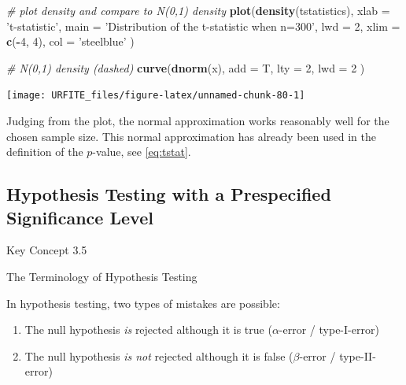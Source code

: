 \documentclass[]{book}
\newenvironment{Shaded}{\begin{snugshade}}{\end{snugshade}}
\newcommand{\KeywordTok}[1]{\textcolor[rgb]{0.13,0.29,0.53}{\textbf{#1}}}
\newcommand{\DataTypeTok}[1]{\textcolor[rgb]{0.13,0.29,0.53}{#1}}
\newcommand{\DecValTok}[1]{\textcolor[rgb]{0.00,0.00,0.81}{#1}}
\newcommand{\StringTok}[1]{\textcolor[rgb]{0.31,0.60,0.02}{#1}}
\newcommand{\CommentTok}[1]{\textcolor[rgb]{0.56,0.35,0.01}{\textit{#1}}}
\newcommand{\OperatorTok}[1]{\textcolor[rgb]{0.81,0.36,0.00}{\textbf{#1}}}
\newcommand{\NormalTok}[1]{#1}
\theoremstyle{definition}
\theoremstyle{definition}
\theoremstyle{definition}
\theoremstyle{remark}
\begin{document}
\begin{Shaded}
\begin{Highlighting}[]
\CommentTok{# plot density and compare to N(0,1) density}
\KeywordTok{plot}\NormalTok{(}\KeywordTok{density}\NormalTok{(tstatistics),}
     \DataTypeTok{xlab =} \StringTok{'t-statistic'}\NormalTok{,}
     \DataTypeTok{main =} \StringTok{'Distribution of the t-statistic when n=300'}\NormalTok{,}
     \DataTypeTok{lwd =} \DecValTok{2}\NormalTok{,}
     \DataTypeTok{xlim =} \KeywordTok{c}\NormalTok{(}\OperatorTok{-}\DecValTok{4}\NormalTok{, }\DecValTok{4}\NormalTok{),}
     \DataTypeTok{col =} \StringTok{'steelblue'}
\NormalTok{     )}

\CommentTok{# N(0,1) density (dashed)}
\KeywordTok{curve}\NormalTok{(}\KeywordTok{dnorm}\NormalTok{(x), }
      \DataTypeTok{add =}\NormalTok{ T, }
      \DataTypeTok{lty =} \DecValTok{2}\NormalTok{, }
      \DataTypeTok{lwd =} \DecValTok{2}
\NormalTok{      )}
\end{Highlighting}
\end{Shaded}

\begin{center}\texttt{[image: URFITE\_files/figure-latex/unnamed-chunk-80-1]} \end{center}

Judging from the plot, the normal approximation works reasonably well
for the chosen sample size. This normal approximation has already been
used in the definition of the \(p\)-value, see \eqref{eq:tstat}.

\subsection*{Hypothesis Testing with a Prespecified Significance
Level}\label{hypothesis-testing-with-a-prespecified-significance-level}

Key Concept 3.5

The Terminology of Hypothesis Testing

In hypothesis testing, two types of mistakes are possible:

\begin{enumerate}
\def\labelenumi{\arabic{enumi}.}
\item
  The null hypothesis \emph{is} rejected although it is true
  (\(\alpha\)-error / type-I-error)
\item
  The null hypothesis \emph{is not} rejected although it is false
  (\(\beta\)-error / type-II-error)
\end{enumerate}
\end{document}
